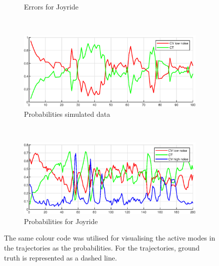 \begin{figure}[ht]
\begin{subfigure}[h]{0.4\textwidth}
        \caption{Errors for Joyride}
        \label{fig:ga_1_joyride_error}
    \end{subfigure}
        \\
    \begin{subfigure}[h]{0.4\textwidth}
        \includegraphics[width=\textwidth]{figures/ga_1/2_probs}
        \caption{Probabilities simulated data}
        \label{fig:ga_1_2_error}
    \end{subfigure}%
    ~
    \begin{subfigure}[h]{0.4\textwidth}
        \includegraphics[width=\textwidth]{figures/ga_1/joyride_probs}
        \caption{Probabilities for Joyride}
        \label{fig:ga_1_joyride_error}
    \end{subfigure}
    \caption{The same colour code was utilised for visualising the active modes in the trajectories as the probabilities. For the trajectories, ground truth is represented as a dashed line. }
    \label{fig:ga_1} 
\end{figure}






